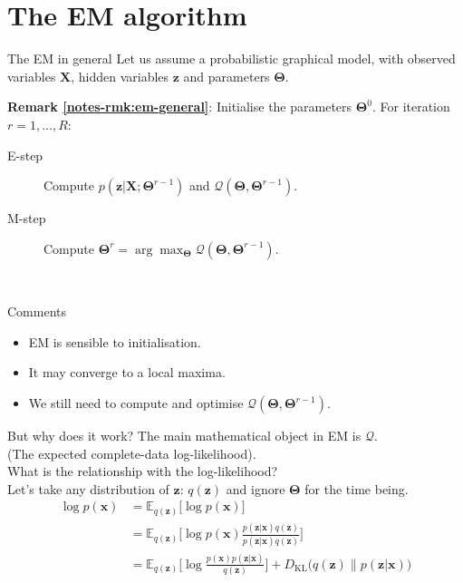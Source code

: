 \documentclass{beamer}
\newcommand{\bs}[1]{\boldsymbol{#1}}
\newcommand{\remark}[2]{\noindent\colorbox{red!10}{\parbox{0.995\textwidth}{\textbf{Remark \ref{notes-rmk:#1}}: #2}}\\}
\begin{document}
\section{The EM algorithm}

\begin{frame}{The EM in general}
Let us assume a probabilistic graphical model, with observed variables $\bs{X}$, hidden variables $\bs{z}$ and parameters $\bs{\Theta}$.\vspace{3mm}

\remark{em-general}{
 Initialise the parameters $\bs{\Theta}^0$. For iteration $r=1,\ldots,R$:
 \begin{description}
  \item[E-step] Compute $p(\bs{z}|\bs{X};\bs{\Theta}^{r-1})$ and $\mathcal{Q}(\bs{\Theta},\bs{\Theta}^{r-1})$.
  \item[M-step] Compute $\bs{\Theta}^{r}=\arg\max_{\bs{\Theta}} \mathcal{Q}(\bs{\Theta},\bs{\Theta}^{r-1})$.
 \end{description}
 }\vspace{3mm}

 Comments
\begin{itemize}
 \item EM is sensible to initialisation.
 \item It may converge to a local maxima.
 \item We still need to compute and optimise $\mathcal{Q}(\bs{\Theta},\bs{\Theta}^{r-1})$.
\end{itemize}
\end{frame}

\begin{frame}{But why does it work?}
 The main mathematical object in EM is $\mathcal{Q}$.\\ {\footnotesize (The expected complete-data log-likelihood).}\vspace{4mm}\\
 
 What is the relationship with the log-likelihood?\\ Let's take any distribution of $\bs{z}$: $q(\bs{z})$ and ignore $\bs{\Theta}$ for the time being.
 \begin{align*}
\log p(\bs{x})&= \mathbb{E}_{q(\bs{z})}\Big[\log p(\bs{x})\Big]\\
&= \mathbb{E}_{q(\bs{z})}\Big[\log p(\bs{x})\frac{p(\bs{z}|\bs{x})q(\bs{z})}{p(\bs{z}|\bs{x})q(\bs{z})}\Big]\\
&= \mathbb{E}_{q(\bs{z})}\Big[\log \frac{p(\bs{x})p(\bs{z}|\bs{x})}{q(\bs{z})}\Big] +  D_{\text{KL}}\Big(q(\bs{z})\Big\lVert p(\bs{z}|\bs{x})\Big)
\end{align*}
\end{frame}
\end{document}

